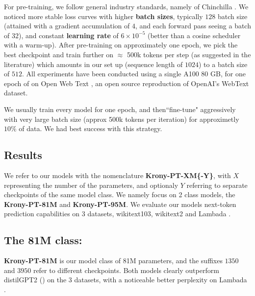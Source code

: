 \documentclass{article}
\begin{document}
{For pre-training, we follow general industry standards, namely of Chinchilla \cite{hoffmann2022training}. We noticed more stable loss curves with higher \textbf{batch sizes}, typically $128$ batch size (attained with a gradient accumulation of $4$, and each forward pass seeing a batch of $32$), and constant \textbf{learning rate} of $6 \times 10^{-5}$ (better than a cosine scheduler with a warm-up). After pre-training on approximately one epoch, we pick the best checkpoint and train further on $\approx$ 500k tokens per step (as suggested in the literature) which amounts in our set up (sequence length of $1024$) to a batch size of $512$. All experiments have been conducted using a single A100 80 GB, for one epoch of on Open Web Text \cite{Gokaslan2019OpenWeb}, an open source reproduction of OpenAI's WebText dataset.


We usually train every model for one epoch, and then``fine-tune" aggressively with very large batch size (approx 500k tokens per iteration) for approximetly $10\%$ of data. We had best success with this strategy.


\subsection{Results}%
\label{sub:results}

We refer to our models with the nomenclature \textbf{Krony-PT-XM\{-Y\}}, with $X$ representing the number of the parameters, and optionaly $Y$ referring to separate checkpoints of the same model class. We namely focus on 2 class models, the  \textbf{Krony-PT-81M} and \textbf{Krony-PT-95M}. We evaluate our models next-token prediction capabilities on 3 datasets, wikitext103, wikitext2 \cite{merity2016pointer} and Lambada \cite{paperno2016lambada}. 

\subsection{The 81M class:}%
\label{sub:The 81M class:}

\textbf{Krony-PT-81M} is our model class of 81M parameters, and the suffixes $1350$ and $3950$ refer to different checkpoints. Both models clearly outperform distilGPT2 (\cite{sanh2019distilbert}) on the 3 datasets, with a noticeable better perplexity on Lambada \cite{paperno2016lambada}.


}
\end{document}
